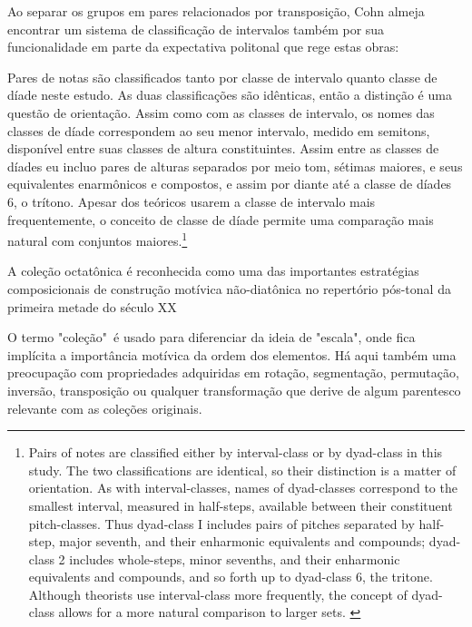 \documentclass[
	12pt,				%
	openright,			%
	twoside,			%
	a4paper,			%
	english,			%
	french,				%
	spanish,			%
	brazil				%
	]{abntex2}
\begin{document}
Ao separar os grupos em pares relacionados por transposição, Cohn almeja encontrar um sistema de classificação de intervalos também por sua funcionalidade em parte da expectativa politonal que rege estas obras:

\begin{citacao}
Pares de notas são classificados tanto por classe de intervalo quanto classe de díade neste estudo. As duas classificações são idênticas, então a distinção é uma questão de orientação. Assim como com as classes de intervalo, os nomes das classes de díade correspondem ao seu menor intervalo, medido em semitons, disponível entre suas classes de altura constituintes. Assim entre as classes de díades eu incluo pares de alturas separados por meio tom, sétimas maiores, e seus equivalentes enarmônicos e compostos, e assim por diante até a classe de díades 6, o trítono. Apesar dos teóricos usarem a classe de intervalo mais frequentemente, o conceito de classe de díade permite uma comparação mais natural com conjuntos maiores.\cite[p. 265-266]{cohn1991bartok}\footnote{Pairs of notes are classified either by interval-class or by dyad-class in this study. The two classifications are identical, so their distinction is a matter of orientation. As with interval-classes, names of dyad-classes correspond to the smallest interval, measured in half-steps, available between their constituent pitch-classes. Thus dyad-class I includes pairs of pitches separated by half-step, major seventh, and their enharmonic equivalents and compounds; dyad-class 2 includes whole-steps, minor sevenths, and their enharmonic equivalents and compounds, and so forth up to dyad-class 6, the tritone. Although theorists use interval-class more frequently, the concept of dyad-class allows for a more natural comparison to larger sets. \cite[p. 265-266]{cohn1991bartok}}
\end{citacao}

A coleção octatônica é reconhecida como uma das importantes estratégias composicionais de construção motívica não-diatônica no repertório pós-tonal da primeira metade do século XX \cite{berger1963problems,antokoletz1984music,lester1989analytic,forte1991debussy,straus2004,de2013simetria}

O termo "coleção"\ é usado para diferenciar da ideia de "escala", onde fica implícita a importância motívica da ordem dos elementos. Há aqui também uma preocupação com propriedades adquiridas em rotação, segmentação, permutação, inversão, transposição ou qualquer transformação que derive de algum parentesco relevante com as coleções originais.
\end{document}
